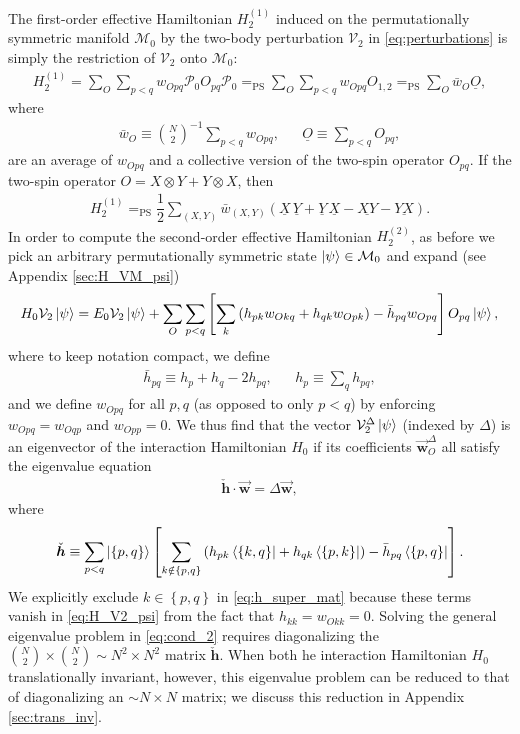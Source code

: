 \documentclass[nofootinbib,notitlepage,11pt]{revtex4-2}
\newcommand{\f}[2]{\dfrac{#1}{#2}} %
\newcommand{\p}[1]{\left(#1\right)} %
\renewcommand{\sp}[1]{\left[#1\right]} %
\renewcommand{\set}[1]{\left\{#1\right\}} %
\renewcommand{\c}{\cdot} %
\newcommand{\m}{\bm} %
\renewcommand{\v}{\vec} %
\newcommand{\1}{\mathds{1}}
\newcommand{\M}{\mathcal{M}}
\renewcommand{\P}{\mathcal{P}}
\newcommand{\V}{\mathcal{V}}
\newcommand{\EQPS}{=_{\text{PS}}}
\newcommand{\col}{\underline}
\begin{document}
The first-order effective Hamiltonian $H_2^{(1)}$ induced on the
permutationally symmetric manifold $\M_0$ by the two-body perturbation
$\V_2$ in \eqref{eq:perturbations} is simply the restriction of $\V_2$
onto $\M_0$:
\begin{align}
  H_2^{(1)} = \sum_O \sum_{p<q} w_{Opq} \P_0 O_{pq} \P_0
  \EQPS \sum_O \sum_{p<q} w_{Opq} O_{1,2}
  \EQPS \sum_O \bar w_O \col{O},
\end{align}
where
\begin{align}
  \bar w_O \equiv {N \choose 2}^{-1} \sum_{p<q} w_{Opq},
  &&
  \col{O} \equiv \sum_{p<q} O_{pq},
\end{align}
are an average of $w_{Opq}$ and a collective version of the two-spin
operator $O_{pq}$.  If the two-spin operator
$O=X\otimes Y+Y\otimes X$, then
\begin{align}
  H_2^{(1)} \EQPS \f12 \sum_{\p{X,Y}} \bar w_{\p{X,Y}}
  \p{\col{X}\,\col{Y} + \col{Y}\,\col{X} - \col{XY} - \col{YX}}.
\end{align}
In order to compute the second-order effective Hamiltonian
$H_2^{(2)}$, as before we pick an arbitrary permutationally symmetric
state $\ket\psi\in\M_0$ and expand (see Appendix \ref{sec:H_VM_psi})
\begin{align}
  H_0 \V_2 \ket\psi
  = E_0 \V_2 \ket\psi
  + \sum_O \sum_{p<q}
  \sp{\sum_k \p{h_{pk} w_{Okq} + h_{qk} w_{Opk}}
  - \bar h_{pq} w_{Opq}}
  O_{pq} \ket\psi,
  \label{eq:H_V2_psi}
\end{align}
where to keep notation compact, we define
\begin{align}
  \bar h_{pq} \equiv h_p + h_q - 2 h_{pq},
  &&
  h_p \equiv \sum_q h_{pq},
\end{align}
and we define $w_{Opq}$ for all $p,q$ (as opposed to only $p<q$) by
enforcing $w_{Opq}=w_{Oqp}$ and $w_{Opp}=0$.  We thus find that the
vector $\V_2^\Delta\ket\psi$ (indexed by $\Delta$) is an eigenvector
of the interaction Hamiltonian $H_0$ if its coefficients
$\v{\m w}_O^\Delta$ all satisfy the eigenvalue equation
\begin{align}
  \check{\m h} \c \v{\m w} = \Delta \v{\m w},
  \label{eq:cond_2}
\end{align}
where
\begin{align}
  \check{\m h}
  \equiv \sum_{p<q} \ket{\set{p,q}} \sp{\sum_{k\notin\set{p,q}}
    \p{h_{pk} \bra{\set{k,q}} + h_{qk} \bra{\set{p,k}}}
    - \bar h_{pq} \bra{\set{p,q}}}.
  \label{eq:h_super_mat}
\end{align}
We explicitly exclude $k\in\set{p,q}$ in \eqref{eq:h_super_mat}
because these terms vanish in \eqref{eq:H_V2_psi} from the fact that
$h_{kk}=w_{Okk}=0$.  Solving the general eigenvalue problem in
\eqref{eq:cond_2} requires diagonalizing the
${N \choose 2}\times{N \choose 2}\sim N^2\times N^2$ matrix
$\check{\m h}$.  When both he interaction Hamiltonian $H_0$
translationally invariant, however, this eigenvalue problem can be
reduced to that of diagonalizing an $\sim N\times N$ matrix; we
discuss this reduction in Appendix \ref{sec:trans_inv}.
\end{document}

